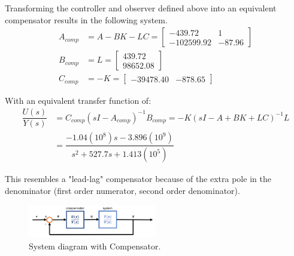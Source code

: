 \documentclass[11pt]{article}
\begin{document}
\begin{enumerate}[label=\textbf{\arabic*.}]
  Transforming the controller and observer defined above into an equivalent 
  compensator results in the following system.
  \begin{equation}
    \begin{split}
      A_{comp} &= A - BK - LC =
      \begin{bmatrix}
        -439.72 & 1 \\ -102599.92 & -87.96
      \end{bmatrix} \\
      B_{comp} &= L =
      \begin{bmatrix}
        439.72 \\ 98652.08
      \end{bmatrix} \\
      C_{comp} &= -K =
      \begin{bmatrix}
        -39478.40 & -878.65
      \end{bmatrix}
    \end{split}
  \end{equation}

  With an equivalent transfer function of:
  \begin{equation}
    \begin{split}
      \dfrac{U(s)}{Y(s)} & = C_{comp}(sI-A_{comp})^{-1}B_{comp} 
      = -K(sI - A + BK + LC)^{-1}L \\
      &= \dfrac{-1.04(10^8)s - 3.896(10^9)}{s^2 + 527.7s + 1.413(10^5)}
    \end{split}
  \end{equation}

  This resembles a "lead-lag" compensator because of the extra pole in the 
  denominator (first order numerator, second order denominator).

  \begin{figure}[H]
    \centering
    \includegraphics[width=0.5\textwidth]{p4-1.png}
    \caption{System diagram with Compensator.}
  \end{figure}


\end{enumerate}
\end{document}
